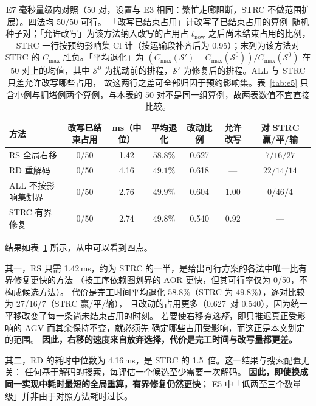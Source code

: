 \documentclass[manuscript,screen,review]{acmart}
\providecommand{\STRC}{\textsc{STRC}}
\newcommand{\NPairs}{50}
\newcommand{\FeasRone}{0/\NPairs}            %
\newcommand{\ClosureAliveFrac}{92\%}
\newcommand{\MsShift}{1.42}          %
\newcommand{\MsRedecode}{4.16}       %
\newcommand{\MsAllFuture}{2.76}      %
\newcommand{\MsCheapRtwo}{2.74}      %
\newcommand{\RedecodeRatio}{1.5}     %
\newcommand{\ShiftBad}{0/\NPairs}    %
\newcommand{\RedecodeBad}{0/\NPairs}
\newcommand{\WinVsShift}{27/16/7}    %
\newcommand{\ResFracCheapRtwo}{0.540}
\newcommand{\ResFracShift}{0.627}
\newcommand{\ResFracRedecode}{0.618}
\newcommand{\ResFracAllFuture}{0.604}
\newcommand{\ClosureShareMean}{0.92} %
\newcommand{\SegShare}{0.95}             %
\begin{document}
\begin{table}[t]
\centering
\caption{E7 毫秒量级内对照（\(\NPairs\) 对，设置与 E3 相同：繁忙走廊阻断，\STRC{} 不做范围扩展）。四法均 \(\NPairs/\NPairs\) 可行。
「改写已结束占用」计改写了已结束占用的算例--随机种子对；「允许改写」为该方法纳入改写的占用占 \(t_{\mathrm{now}}\)
之后尚未结束占用的比例，\STRC{} 一行按预约影响集 \(\mathrm{Cl}\) 计（按运输段补齐后为 \SegShare）；末列为该方法对 \STRC{} 的 \(C_{\max}\) 胜负。「平均退化」为 \((C_{\max}(\mathcal{S}')-C_{\max}(\mathcal{S}^0))/C_{\max}(\mathcal{S}^0)\) 在 \(\NPairs\) 对上的均值，其中 \(\mathcal{S}^0\) 为扰动前的排程，\(\mathcal{S}'\) 为修复后的排程。ALL 与 \STRC{} 只差允许改写哪些占用，
故这两行之差可全部归因于预约影响集。表~\ref{tab:e5} 只含小例与拥堵例两个算例，与本表的 \(\NPairs\) 对不是同一组算例，故两表数值不宜直接比较。}
\label{tab:cheap}
\small
\begin{tabular}{@{}lcccccc@{}}
\toprule
方法 & 改写已结束占用 & ms（中位）& 平均退化 & 改动比例 & 允许改写 & 对 \STRC{} 赢/平/输 \\
\midrule
RS 全局右移      & \ShiftBad     & \MsShift    & \(58.8\%\) & \ResFracShift    & ---   & \(7/16/27\) \\
RD 重解码        & \RedecodeBad  & \MsRedecode & \(49.1\%\) & \ResFracRedecode & ---   & \(22/14/14\) \\
ALL 不按影响集划界 & \ShiftBad     & \MsAllFuture & \(49.9\%\) & \ResFracAllFuture & \(1.00\) & \(0/46/4\) \\
\STRC{} 有界修复      & \ShiftBad     & \MsCheapRtwo & \(49.8\%\) & \ResFracCheapRtwo & \ClosureShareMean & --- \\
\bottomrule
\end{tabular}
\end{table}

结果如表~\ref{tab:cheap} 所示，从中可以看到四点。

其一，RS 只需 \MsShift\,ms，约为 \STRC{} 的一半，是给出可行方案的各法中唯一比有界修复更快的方法
（按工序依赖图划界的 AOR 更快，但其可行率仅为 \FeasRone，不构成候选方法）。
代价是完工时间平均退化 \(58.8\%\)（\STRC{} 为 \(49.8\%\)），逐对比较为 \WinVsShift（\STRC{} 赢/平/输），
且改动的占用更多（\ResFracShift\ 对 \ResFracCheapRtwo），因为统一平移改变了每一条尚未结束占用的时刻。
若要使右移\emph{有选择}，即只推迟真正受影响的 AGV 而其余保持不变，就必须先
确定哪些占用受影响，而这正是本文划定的范围。
\textbf{因此，右移的速度来自放弃选择，代价是完工时间与改写量都更差。}

其二，RD 的耗时中位数为 \MsRedecode\,ms，是 \STRC{} 的 \RedecodeRatio\ 倍。这一结果与搜索配置无关：
任何基于解码的搜索，每评估一个候选至少需要一次解码。
\textbf{因此，即使换成同一实现中耗时最短的全局重算，有界修复仍然更快}；
E5 中「低两至三个数量级」并非由于对照方法耗时过长。
\end{document}
